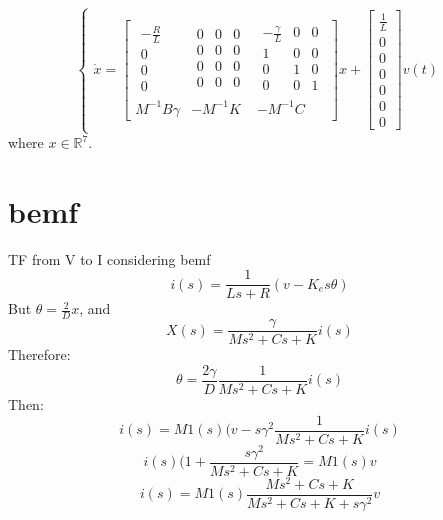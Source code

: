 \begin{equation}
\begin{cases}
\dot{x}=
\left[ \begin{array} { c|c|c  } 
                \begin{array}{c} 
               -\frac{R}{L} \\ 
                0 \\
                0 \\
                0
                \end{array} &
                \begin{array}{ccc} 
               0 & 0 & 0\\ 
                0 & 0  &0 \\
                0  & 0  & 0\\
                0 & 0 &0
                \end{array}&
                \begin{array}{ccc} 
               -\frac{\gamma}{L} & 0 &0\\ 
                1 & 0 &0 \\
                0  & 1  &0 \\
                0 & 0 & 1
                \end{array} \\
                \hline 
                M^{-1}B\gamma& -M^{-1}K & -M^{-1}C
\end{array} \right] 
x+\begin{bmatrix}\frac{1}{L} \\ 0 \\ 0 \\ 0 \\ 0\\0 \\0 \end{bmatrix}v(t)
\end{cases}
\end{equation}
where $x \in \mathbb{R}^7$.
\section{bemf}
TF from V to I considering bemf
$$i(s) = \frac{1}{Ls+R}(v-K_e s\theta)$$
But $\theta = \frac{2}{D}x$, and
$$X(s) = \frac{\gamma}{Ms^2+Cs+K}i(s)$$
Therefore:
$$\theta = \frac{2\gamma}{D}\frac{1}{Ms^2+Cs+K}i(s)$$
Then:
$$i(s) = M1(s)(v-s\gamma^2\frac{1}{Ms^2+Cs+K}i(s)$$
$$i(s) (1+\frac{s\gamma^2}{Ms^2+Cs+K} = M1(s) v$$
$$i(s) = M1(s) \frac{Ms^2+Cs+K}{Ms^2+Cs+K+s\gamma^2}v$$